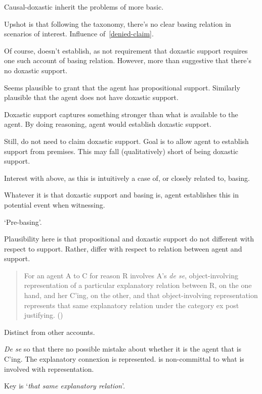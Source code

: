 \begin{note}[Doxastic]
  Causal-doxastic inherit the problems of more basic.

  Upshot is that following the taxonomy, there's no clear basing relation in scenarios of interest.
  Influence of~\ref{denied-claim}.

  Of course, doesn't establish, as not requirement that doxastic support requires one such account of basing relation.
  However, more than suggestive that there's no doxastic support.

  
\end{note}

\begin{note}[Summarising]
  Seems plausible to grant that the agent has propositional support.
  Similarly plausible that the agent does not have doxastic support.

  Doxastic support captures something stronger than what is available to the agent.
  By doing reasoning, agent would establish doxastic support.

  Still, do not need to claim doxastic support.
  Goal is to allow agent to establish support from premises.
  This may fall (qualitatively) short of being doxastic support.

  Interest with above, as this is intuitively a case of, or closely related to, basing.
\end{note}

\begin{note}
  Whatever it is that doxastic support and basing is, agent establishes this in potential event when witnessing.

  `Pre-basing'.

  Plausibility here is that propositional and doxastic support do not different with respect to support.
  Rather, differ with respect to relation between agent and support.
\end{note}

\begin{note}
  
\end{note}

\begin{note}
    \begin{quote}
    For an agent A to C for reason R involves A’s \emph{de se}, object-involving representation of a particular explanatory relation between R, on the one hand, and her C’ing, on the other, and that object-involving representation represents that same explanatory relation under the category ex post justifying.\nolinebreak
    \mbox{}\hfill\mbox{(\citeyear[204]{Neta:2019aa})}
  \end{quote}
  Distinct from other accounts.

  \emph{De se} so that there no possible mistake about whether it is the agent that is C'ing.
  The explanatory connexion is represented.
  \citeauthor{Neta:2019aa} is non-committal to what is involved with representation.

  Key is `\emph{that same explanatory relation}'.
\end{note}


